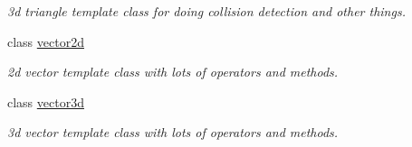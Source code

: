 \begin{DoxyCompactItemize}
\begin{DoxyCompactList}\small\item\em 3d triangle template class for doing collision detection and other things. \end{DoxyCompactList}\item 
class \hyperlink{classirr_1_1core_1_1vector2d}{vector2d}
\begin{DoxyCompactList}\small\item\em 2d vector template class with lots of operators and methods. \end{DoxyCompactList}\item 
class \hyperlink{classirr_1_1core_1_1vector3d}{vector3d}
\begin{DoxyCompactList}\small\item\em 3d vector template class with lots of operators and methods. \end{DoxyCompactList}\end{DoxyCompactItemize}
